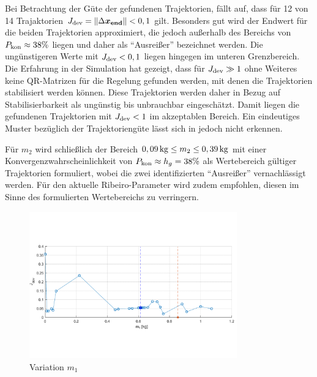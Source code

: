 Bei Betrachtung der Güte der gefundenen Trajektorien, fällt auf, dass für 12 von 14 Trajaktorien $J_{\mathrm{dev}} = \left\| \Delta \boldsymbol{x_{\mathrm{end}}} \right\|<0,1$ gilt. Besonders gut wird der Endwert für die beiden Trajektorien approximiert, die jedoch außerhalb des Bereichs von $P_{\mathrm{kon}}\approx38\%$ liegen und daher als "`Ausreißer"' bezeichnet werden. Die ungünstigeren Werte mit  $J_{\mathrm{dev}}<0,1$ liegen hingegen im unteren Grenzbereich. Die Erfahrung in der Simulation hat gezeigt, dass für $J_{\mathrm{dev}}\gg1$ ohne Weiteres keine QR-Matrizen für die Regelung gefunden werden, mit denen die Trajektorien stabilisiert werden können. Diese Trajektorien werden daher in Bezug auf Stabilisierbarkeit als ungünstig bis unbrauchbar eingeschätzt. Damit liegen die gefundenen Trajektorien mit $J_{\mathrm{dev}}<1$ im akzeptablen Bereich. Ein eindeutiges Muster bezüglich der Trajektoriengüte lässt sich in  jedoch nicht erkennen.

Für $m_2$ wird schließlich der Bereich $0,09\,\mathrm{kg}\leq m_2 \leq0,39\,\mathrm{kg}$ mit einer Konvergenzwahrscheinlichkeit von $P_{\mathrm{kon}}\approx h_g=38 \%$ als Wertebereich gültiger Trajektorien formuliert, wobei die zwei identifizierten "`Ausreißer"' vernachlässigt werden. Für den aktuelle Ribeiro-Parameter wird zudem empfohlen, diesen im Sinne des formulierten Wertebereichs zu verringern.

\begin{figure}
	\centering
		\includegraphics[width=0.8\textwidth]{Bilder/Trajektorien/m1.pdf}
	\caption{Variation $m_1$}
	\label{fig:trjvarm1} %
\end{figure}

